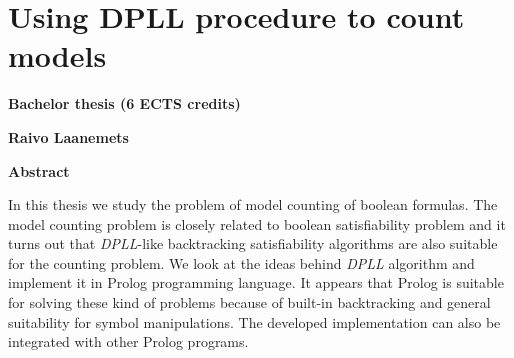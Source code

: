 \chapter*{Using DPLL procedure to count models}

{\textbf{\Large Bachelor thesis (6 ECTS credits)}}

\vspace{1cm}

{\textbf{\Large Raivo Laanemets}}

\vspace{1cm}

{\textbf{\Large Abstract}}

\vspace{1cm}

In this thesis we study the problem of model counting of boolean formulas.
The model counting problem is closely related to boolean satisfiability
problem and it turns out that \textit{DPLL}-like backtracking
satisfiability algorithms are also suitable for the counting problem. We look at
the ideas behind \textit{DPLL} algorithm and implement it in Prolog programming
language. It appears that Prolog is suitable for solving these kind of problems
because of built-in backtracking and general suitability for symbol
manipulations. The developed implementation can also be integrated with other
Prolog programs.


